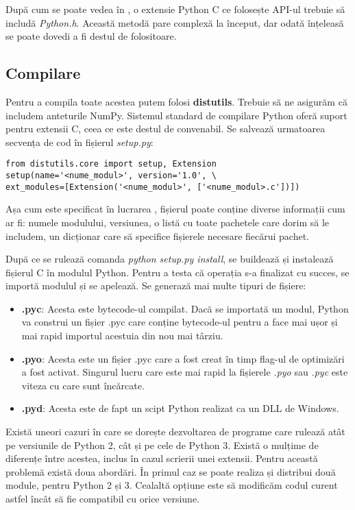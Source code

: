 După cum se poate vedea în \cite{capi}, o extensie Python C ce folosește API-ul trebuie să includă \textit{Python.h}. Această metodă pare complexă la început, dar odată înțeleasă se poate dovedi a fi destul de folositoare.



\subsection{Compilare} 

Pentru a compila toate acestea putem folosi \textbf{distutils}. Trebuie să ne asigurăm că includem anteturile NumPy. Sistemul standard de compilare Python oferă suport pentru extensii C, ceea ce este destul de convenabil. Se salvează urmatoarea secvența de cod în fișierul \textit{setup.py}:

\lstset{language=Python,frame=single, showstringspaces=false}
\begin{lstlisting}
from distutils.core import setup, Extension
setup(name='<nume_modul>', version='1.0', \
ext_modules=[Extension('<nume_modul>', ['<nume_modul>.c'])])
\end{lstlisting}

Așa cum este specificat în lucrarea \cite{py-book}, fișierul poate conține diverse informații cum ar fi: numele modulului, versiunea, o listă cu toate pachetele care dorim să le includem, un dicționar care să specifice fișierele necesare fiecărui pachet.

După ce se rulează comanda \textit{python setup.py install},  se buildează și instalează fișierul C în modulul Python. Pentru a testa că operația s-a finalizat cu succes, se importă modulul și se apelează. Se generază mai multe tipuri de fișiere:
\begin{itemize}
  \item \textbf{.pyc}: Acesta este bytecode-ul compilat. Dacă se importată un modul, Python va construi un fișier .pyc care conține bytecode-ul pentru a face mai ușor și mai rapid  importul acestuia din nou mai târziu.
  \item \textbf{.pyo}: Acesta este un fișier .pyc care a fost creat în timp flag-ul de optimizări a fost activat. Singurul lucru care este mai rapid la fișierele \textit{.pyo} sau \textit{.pyc} este viteza cu care sunt încărcate.
  \item \textbf{.pyd}: Acesta este de fapt un scipt Python realizat ca un DLL de Windows.
\end{itemize}

Există uneori cazuri în care se dorește dezvoltarea de programe care rulează atât pe versiunile de Python 2, cât și pe cele de Python 3. Există o mulțime de diferențe între acestea, inclus în cazul scrierii unei extensii. Pentru această problemă există doua abordări. În primul caz se poate realiza și distribui două module, pentru Python 2 și 3. Cealaltă opțiune este să modificăm codul curent astfel încât să fie compatibil cu orice versiune.

